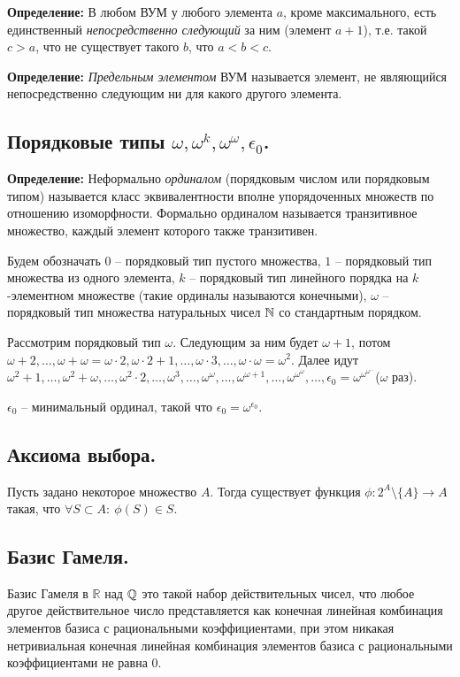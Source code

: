 \textbf{Определение:} В любом ВУМ у любого элемента $a$, кроме максимального, есть единственный \textit{непосредственно следующий} за ним (элемент $a + 1$), т.е. такой $c > a$, что не существует такого $b$, что $a < b < c$.

\textbf{Определение:} \textit{Предельным элементом} ВУМ называется элемент, не являющийся непосредственно следующим ни для какого другого элемента.

\subsection{Порядковые типы $\omega, \omega^k, \omega^{\omega}, \epsilon_0$.}

\textbf{Определение:} Неформально \textit{ординалом} (порядковым числом или порядковым типом) называется
класс эквивалентности вполне упорядоченных множеств по отношению изоморфности. Формально ординалом называется транзитивное множество, каждый элемент которого также транзитивен.

Будем обозначать $0$ -- порядковый тип пустого множества, $1$ -- порядковый тип множества из одного элемента, $k$ -- порядковый тип линейного порядка на $k$-элементном множестве (такие ординалы называются конечными), $\omega$ -- порядковый тип множества натуральных чисел $\mathbb{N}$ со стандартным порядком.

Рассмотрим порядковый тип $\omega$. Следующим за ним будет $\omega + 1$, потом $\omega + 2, \ldots, \omega + \omega = \omega \cdot 2, \omega \cdot 2 + 1, \ldots, \omega \cdot 3, \ldots, \omega \cdot \omega = \omega^2$. Далее идут $\omega^2 + 1, \ldots, \omega^2 + \omega, \ldots, \omega^{2}\cdot 2, \ldots, \omega^3, \ldots, \omega^\omega, \ldots, \omega^{\omega + 1}, \ldots, \omega^{\omega^{\omega}}, \ldots, \epsilon_{0} = \omega^{\omega^{\omega^{\ldots}}}$($\omega$ раз).

$\epsilon_0$ -- минимальный ординал, такой что $\epsilon_0 = \omega^{\epsilon_0}$.

\subsection{Аксиома выбора.}

Пусть задано некоторое множество $A$. Тогда существует функция $\phi: 2^A \setminus \{A\} \rightarrow A$ такая, что $\forall S \subset A:\ \phi(S) \in S$.

\subsection{Базис Гамеля.}

Базис Гамеля в $\mathbb R$ над $\mathbb{Q}$ это такой набор действительных чисел, что любое другое действительное число представляется как конечная линейная комбинация элементов базиса с рациональными коэффициентами, при этом никакая нетривиальная конечная линейная комбинация элементов базиса с рациональными коэффициентами не равна $0$.
